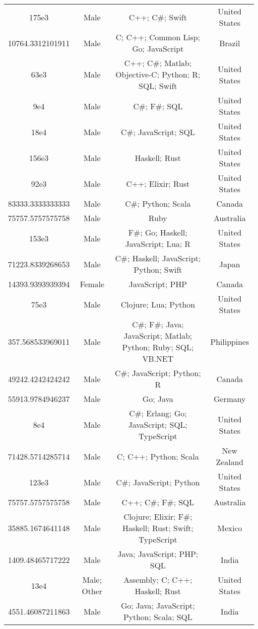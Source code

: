 \begin{center}
\begin{tabular}{ |c|c|c|c| }
175e3  &  Male  &  C++; C\#; Swift  &  United States  \\ 
10764.3312101911  &  Male  &  C; C++; Common Lisp; Go; JavaScript  &  Brazil  \\ 
63e3  &  Male  &  C++; C\#; Matlab; Objective-C; Python; R; SQL; Swift  &  United States  \\ 
9e4  &  Male  &  C\#; F\#; SQL  &  United States  \\ 
18e4  &  Male  &  C\#; JavaScript; SQL  &  United States  \\ 
156e3  &  Male  &  Haskell; Rust  &  United States  \\ 
92e3  &  Male  &  C++; Elixir; Rust  &  United States  \\ 
83333.3333333333  &  Male  &  C\#; Python; Scala  &  Canada  \\ 
75757.5757575758  &  Male  &  Ruby  &  Australia  \\ 
153e3  &  Male  &  F\#; Go; Haskell; JavaScript; Lua; R  &  United States  \\ 
71223.8339268653  &  Male  &  C\#; Haskell; JavaScript; Python; Swift  &  Japan  \\ 
14393.9393939394  &  Female  &  JavaScript; PHP  &  Canada  \\ 
75e3  &  Male  &  Clojure; Lua; Python  &  United States  \\ 
357.568533969011  &  Male  &  C\#; F\#; Java; JavaScript; Matlab; Python; Ruby; SQL; VB.NET  &  Philippines  \\ 
49242.4242424242  &  Male  &  C\#; JavaScript; Python; R  &  Canada  \\ 
55913.9784946237  &  Male  &  Go; Java  &  Germany  \\ 
8e4  &  Male  &  C\#; Erlang; Go; JavaScript; SQL; TypeScript  &  United States  \\ 
71428.5714285714  &  Male  &  C; C++; Python; Scala  &  New Zealand  \\ 
123e3  &  Male  &  C\#; JavaScript; Python  &  United States  \\ 
75757.5757575758  &  Male  &  C++; C\#; F\#; SQL  &  Australia  \\ 
35885.1674641148  &  Male  &  Clojure; Elixir; F\#; Haskell; Rust; Swift; TypeScript  &  Mexico  \\ 
1409.48465717222  &  Male  &  Java; JavaScript; PHP; SQL  &  India  \\ 
13e4  &  Male; Other  &  Assembly; C; C++; Haskell; Rust  &  United States  \\ 
4551.46087211863  &  Male  &  Go; Java; JavaScript; Python; Scala; SQL  &  India  \\ 

\end{tabular}
\end{center}
